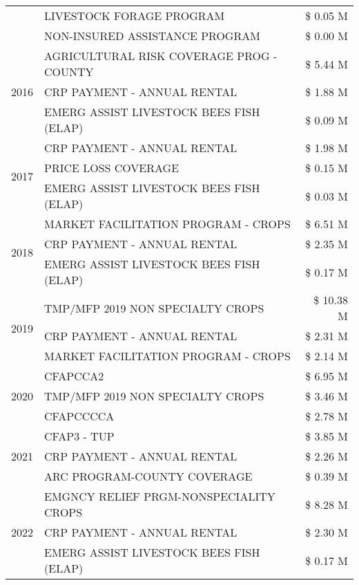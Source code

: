 \begin{tabular}{llr}
 & LIVESTOCK FORAGE PROGRAM & \$ 0.05 M \\
 & NON-INSURED ASSISTANCE PROGRAM & \$ 0.00 M \\
\cline{1-3}
\multirow[t]{3}{*}{2016} & AGRICULTURAL RISK COVERAGE PROG - COUNTY & \$ 5.44 M \\
 & CRP PAYMENT - ANNUAL RENTAL & \$ 1.88 M \\
 & EMERG ASSIST LIVESTOCK BEES FISH (ELAP) & \$ 0.09 M \\
\cline{1-3}
\multirow[t]{3}{*}{2017} & CRP PAYMENT - ANNUAL RENTAL & \$ 1.98 M \\
 & PRICE LOSS COVERAGE & \$ 0.15 M \\
 & EMERG ASSIST LIVESTOCK BEES FISH (ELAP) & \$ 0.03 M \\
\cline{1-3}
\multirow[t]{3}{*}{2018} & MARKET FACILITATION PROGRAM - CROPS & \$ 6.51 M \\
 & CRP PAYMENT - ANNUAL RENTAL & \$ 2.35 M \\
 & EMERG ASSIST LIVESTOCK BEES FISH (ELAP) & \$ 0.17 M \\
\cline{1-3}
\multirow[t]{3}{*}{2019} & TMP/MFP 2019 NON SPECIALTY CROPS & \$ 10.38 M \\
 & CRP PAYMENT - ANNUAL RENTAL & \$ 2.31 M \\
 & MARKET FACILITATION PROGRAM - CROPS & \$ 2.14 M \\
\cline{1-3}
\multirow[t]{3}{*}{2020} & CFAPCCA2 & \$ 6.95 M \\
 & TMP/MFP 2019 NON SPECIALTY CROPS & \$ 3.46 M \\
 & CFAPCCCCA & \$ 2.78 M \\
\cline{1-3}
\multirow[t]{3}{*}{2021} & CFAP3 - TUP & \$ 3.85 M \\
 & CRP PAYMENT - ANNUAL RENTAL & \$ 2.26 M \\
 & ARC PROGRAM-COUNTY COVERAGE & \$ 0.39 M \\
\cline{1-3}
\multirow[t]{3}{*}{2022} & EMGNCY RELIEF PRGM-NONSPECIALITY CROPS & \$ 8.28 M \\
 & CRP PAYMENT - ANNUAL RENTAL & \$ 2.30 M \\
 & EMERG ASSIST LIVESTOCK BEES FISH (ELAP) & \$ 0.17 M \\
\cline{1-3}
\bottomrule
\end{tabular}
